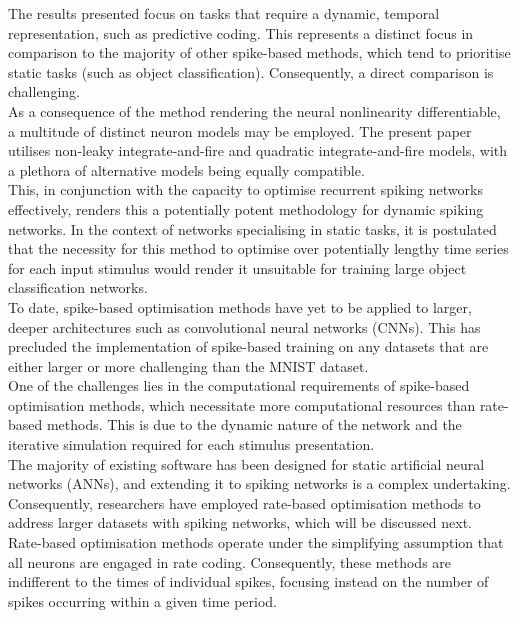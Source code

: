 \noindent The results presented focus on tasks that require a dynamic, temporal representation, such as predictive coding. This represents a distinct focus in comparison to the majority of other spike-based methods, which tend to prioritise static tasks (such as object classification). Consequently, a direct comparison is challenging. \\

\noindent As a consequence of the method rendering the neural nonlinearity differentiable, a multitude of distinct neuron models may be employed. The present paper utilises non-leaky integrate-and-fire and quadratic integrate-and-fire models, with a plethora of alternative models being equally compatible. \\

\noindent This, in conjunction with the capacity to optimise recurrent spiking networks effectively, renders this a potentially potent methodology for dynamic spiking networks. In the context of networks specialising in static tasks, it is postulated that the necessity for this method to optimise over potentially lengthy time series for each input stimulus would render it unsuitable for training large object classification networks. \\

\noindent To date, spike-based optimisation methods have yet to be applied to larger, deeper architectures such as convolutional neural networks (CNNs). This has precluded the implementation of spike-based training on any datasets that are either larger or more challenging than the MNIST dataset. \\

\noindent One of the challenges lies in the computational requirements of spike-based optimisation methods, which necessitate more computational resources than rate-based methods. This is due to the dynamic nature of the network and the iterative simulation required for each stimulus presentation. \\

\noindent The majority of existing software has been designed for static artificial neural networks (ANNs), and extending it to spiking networks is a complex undertaking. Consequently, researchers have employed rate-based optimisation methods to address larger datasets with spiking networks, which will be discussed next. \\

\noindent Rate-based optimisation methods operate under the simplifying assumption that all neurons are engaged in rate coding. Consequently, these methods are indifferent to the times of individual spikes, focusing instead on the number of spikes occurring within a given time period. \\

